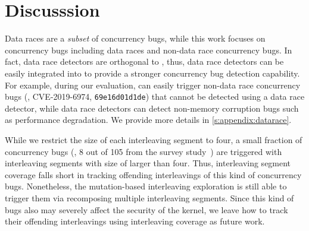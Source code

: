 \section{Discusssion}
\label{s:discussion}

%
Data races are a \textit{subset} of concurrency bugs, while this work
focuses on concurrency bugs including data races and non-data race
concurrency bugs.
%
In fact, data race detectors are orthogonal to \sys, thus, data race
detectors can be easily integrated into \sys to provide a stronger
concurrency bug detection capability.
%
For example, during our evaluation, \sys can easily trigger non-data
race concurrency bugs (\eg, CVE-2019-6974, \texttt{69e16d01d1de}) that
cannot be detected using a data race detector, while data race
detectors can detect non-memory corruption bugs such as performance
degradation. We provide more details in \autoref{s:appendix:datarace}.


%
While we restrict the size of each interleaving segment to four, a
small fraction of concurrency bugs (\eg, 8 out of 105 from the survey
study~\cite{learningfrommistakes}) are triggered with interleaving
segments with size of larger than four.
%
Thus, interleaving segment coverage falls short in tracking offending
interleavings of this kind of concurrency bugs. Nonetheless, the
mutation-based interleaving exploration is still able to trigger them
via recomposing multiple interleaving segments.
%
Since this kind of bugs also may severely affect the security of the
kernel, we leave how to track their offending interleavings using
interleaving coverage as future work.

